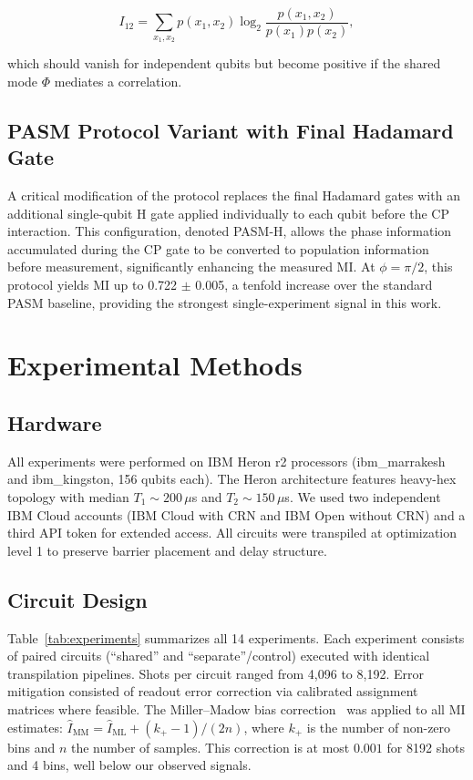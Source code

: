 ﻿\documentclass[12pt,a4paper]{article}
\begin{document}
\begin{equation}
I_{12} = \sum_{x_1,x_2} p(x_1,x_2) \log_2 \frac{p(x_1,x_2)}{p(x_1)p(x_2)},
\end{equation}

which should vanish for independent qubits but become positive if the shared mode $\Phi$ mediates a correlation.

\subsection{PASM Protocol Variant with Final Hadamard Gate}

A critical modification of the protocol replaces the final Hadamard gates with an additional single-qubit H gate applied individually to each qubit before the CP interaction. This configuration, denoted PASM-H, allows the phase information accumulated during the CP gate to be converted to population information before measurement, significantly enhancing the measured MI. At $\phi = \pi/2$, this protocol yields MI up to 0.722 $\pm$ 0.005, a tenfold increase over the standard PASM baseline, providing the strongest single-experiment signal in this work.

\section{Experimental Methods}
\label{sec:methods}

\subsection{Hardware}

All experiments were performed on IBM Heron r2 processors (ibm\_marrakesh and ibm\_kingston, 156 qubits each). The Heron architecture features heavy-hex topology with median $T_1 \sim 200\,\mu$s and $T_2 \sim 150\,\mu$s. We used two independent IBM Cloud accounts (IBM Cloud with CRN and IBM Open without CRN) and a third API token for extended access. All circuits were transpiled at optimization level 1 to preserve barrier placement and delay structure.

\subsection{Circuit Design}

Table~\ref{tab:experiments} summarizes all 14 experiments. Each experiment consists of paired circuits (``shared'' and ``separate''/control) executed with identical transpilation pipelines. Shots per circuit ranged from 4,096 to 8,192. Error mitigation consisted of readout error correction via calibrated assignment matrices where feasible. The Miller--Madow bias correction~\cite{miller1955} was applied to all MI estimates: $\hat{I}_{\text{MM}} = \hat{I}_{\text{ML}} + (k_+ - 1)/(2n)$, where $k_+$ is the number of non-zero bins and $n$ the number of samples. This correction is at most $0.001$ for 8192 shots and 4 bins, well below our observed signals.
\end{document}

